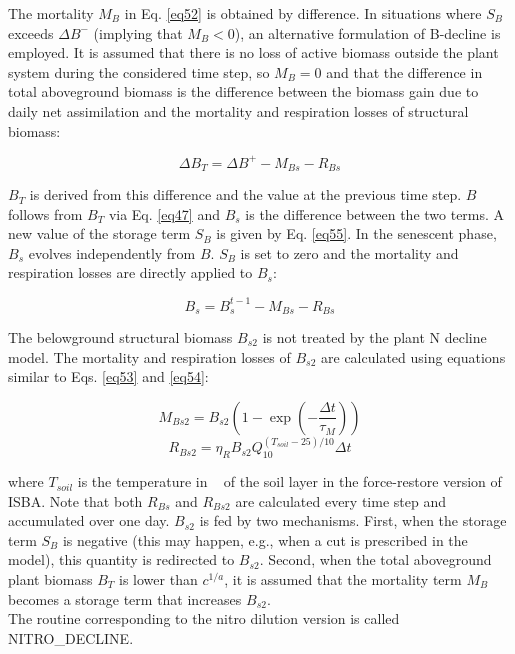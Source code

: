 {The mortality $M_{B}$ in Eq. \ref{eq52} is obtained by difference. In situations where $S_{B}$ exceeds $\Delta B^{-}$ (implying that
$M_{B}<0$), an alternative formulation of B-decline is employed. It is assumed that there is no loss of active
biomass outside the plant system during the considered time step, so $M_{B}=0$ and that the difference in
total aboveground biomass is the difference between the biomass gain due to daily net assimilation
and the mortality and respiration losses of structural biomass:

\begin{equation}
\Delta B_{T} = \Delta B^{+} - M_{Bs} -  R_{Bs}
\end{equation}

$B_{T}$ is derived from this difference and the value at the previous time step. $B$ follows from $B_{T}$ via Eq. \ref{eq47}
and $B_{s}$ is the difference between the two terms. A new value of the storage term $S_{B}$ is given by Eq. \ref{eq55}.
In the senescent phase, $B_{s}$ evolves independently from $B$. $S_{B}$ is set to zero and the mortality and
respiration losses are directly applied to $B_{s}$:

\begin{equation}
B_{s} = B_{s}^{t-1} - M_{Bs} -  R_{Bs}
\end{equation}

The belowground structural biomass $B_{s2}$ is not treated by the plant N decline model. The mortality and
respiration losses of $B_{s2}$  are calculated using equations similar to Eqs. \ref{eq53} and \ref{eq54}:

\begin{equation}
M_{Bs2} = B_{s2} \left (   1-\exp \left (  -\frac{\Delta t}{\tau_{M}}      \right )           \right )
\end{equation}
\begin{equation}
R_{Bs2} = \eta_{R}B_{s2}Q_{10}^{(T_{soil}-25)/10} \Delta t
\end{equation}

where $T_{soil}$ is the temperature in \textcelsius ~ of the soil layer in the force-restore version of ISBA. Note that both
$R_{Bs}$ and $R_{Bs2}$ are calculated every time step and accumulated over one day. $B_{s2}$ is fed by two
mechanisms. First, when the storage term $S_{B}$ is negative (this may happen, e.g., when a cut is
prescribed in the model), this quantity is redirected to $B_{s2}$. Second, when the total aboveground plant
biomass $B_{T}$ is lower than $c^{1/a}$, it is assumed that the mortality term $M_{B}$ becomes a storage term that
increases $B_{s2}$. \\
The routine corresponding to the nitro dilution version is called NITRO\_DECLINE. \\

}
